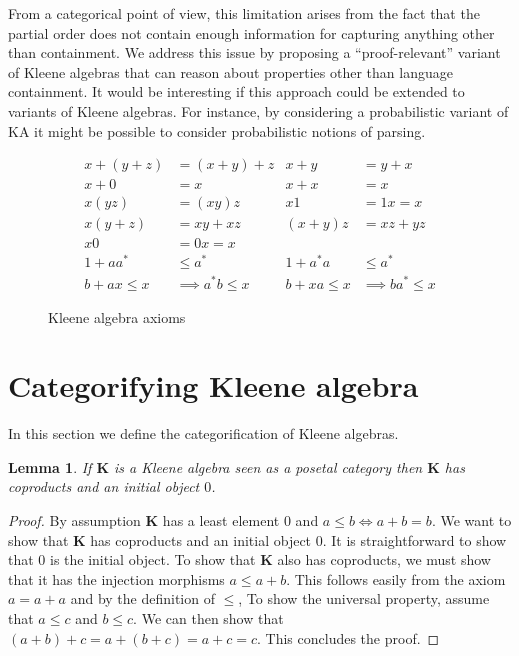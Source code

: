 \documentclass[12pt,a4paper]{article}
\numberwithin{equation}{section}
\newcommand{\cat}{%
\mathbf%
}
\theoremstyle{plain}
\newtheorem{lemma}[theorem]{Lemma}
\theoremstyle{definition}
\begin{document}
From a categorical point of view, this limitation arises from the fact that the partial order does not contain enough information for capturing anything other than containment. We address this issue by proposing a ``proof-relevant'' variant of Kleene algebras that can reason about properties other than language containment. It would be interesting if this approach could be extended to variants of Kleene algebras. For instance, by considering a probabilistic variant of KA it might be possible to consider probabilistic notions of parsing.
%
\begin{figure}
  \begin{align*}
    x + (y + z) &= (x + y) + z & x + y &= y + x\\
    x + 0 &= x & x + x &= x\\
    x(yz) &= (xy)z & x1 &= 1x = x\\
    x(y + z) &= xy + xz & (x + y)z &= xz + yz\\
    x0 &= 0x = x & & \\
    1 + aa^* &\leq a^* & 1 + a^*a &\leq a^*\\
     b + ax \leq x &\implies a^*b \leq x &  b + xa \leq x &\implies ba^* \leq x
  \end{align*}
  \label{fig:axioms}
  \caption{Kleene algebra axioms}
\end{figure}

\section{Categorifying Kleene algebra} In this section we define the categorification of Kleene algebras.

\begin{lemma}
  If $\cat{K}$ is a Kleene algebra seen as a posetal category then $\cat{K}$ has coproducts and an initial object $0$.%
\end{lemma}
\begin{proof}

  By assumption $\cat{K}$ has a least element $0$ and $a \leq b \iff a + b = b$. We want to show that $\cat{K}$ has coproducts and an initial object $0$. It is straightforward to show that $0$ is the initial object. To show that $\cat{K}$ also has coproducts, we must show that it has the injection morphisms $a \leq a + b$. This follows easily from the axiom $a = a + a$ and by the definition of $\leq$, To show the universal property, assume that $a \leq c$ and $b \leq c$. We can then show that $(a + b) + c = a + (b + c) = a + c = c$. This concludes the proof.
\end{proof}
\end{document}
